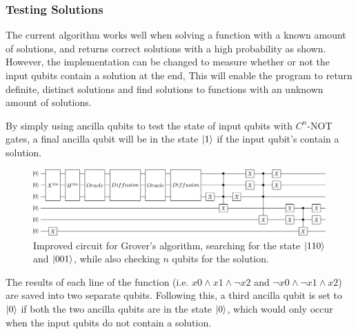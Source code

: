 \documentclass[a4paper,10pt, titlepage, twoside]{article}
\begin{document}
\subsubsection{Testing Solutions}
The current algorithm works well when solving a function with a known amount of solutions, and returns correct solutions with a high probability as shown. However, the implementation can be changed to measure whether or not the input qubits contain a solution at the end, This will enable the program to return definite, distinct solutions and find solutions to functions with an unknown amount of solutions.\par
By simply using ancilla qubits to test the state of input qubits with $C^n$-NOT gates, a final ancilla qubit will be in the state $\ket{1}$ if the input qubit's contain a solution.

\begin{figure}[H]
    \centering
    \includegraphics[width=\textwidth]{groverFinal}
    \caption{Improved circuit for Grover's algorithm, searching for the state $\ket{110}$ and $\ket{001}$, while also checking $n$ qubits for the solution.}
\end{figure}
The results of each line of the function (i.e. $x0 \land x1 \land \neg x2$ and $\neg x0 \land \neg x1 \land x2$) are saved into two separate qubits. Following this, a third ancilla qubit is set to $\ket{0}$ if both the two ancilla qubits are in the state $\ket{0}$, which would only occur when the input qubits do not contain a solution.
\end{document}
